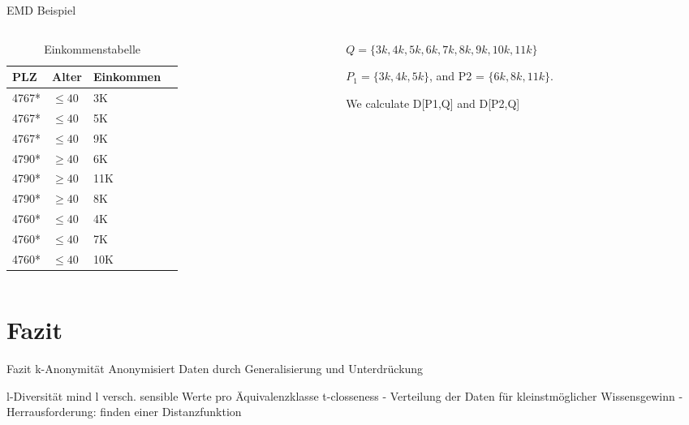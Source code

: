 \begin{frame} {EMD Beispiel}

\begin{columns}[T]
  \begin{column}{0.5\textwidth}
    \begin{table}[]
      \centering
      \label{tclossenessExample}
      \begin{tabular}{|l|l|l|l}
      \hline
      \textbf{PLZ}   & \textbf{Alter}    & \textbf{Einkommen} \\\hline
      4767* & $\le 40$ & 3K \\
      4767* & $\le 40$ & 5K \\
      4767* & $\le 40$ & 9K \\\hline
      4790* & $\ge 40$ & 6K \\
      4790* & $\ge 40$ & 11K \\
      4790* & $\ge 40$ & 8K \\\hline
      4760* & $\le 40$ & 4K \\
      4760* & $\le 40$ & 7K \\
      4760* & $\le 40$ & 10K \\\hline
      \end{tabular}
      \caption{Einkommenstabelle}
    \end{table}
    \end{column}

      \begin{column}{0.5\textwidth}
        $Q = \{3k, 4k, 5k, 6k, 7k, 8k, 9k, 10k, 11k\}$
        
        $P_1 = \{3k, 4k, 5k\}$, and P2 = \(\{6k, 8k, 11k\}\). 
        
        We calculate
        D[P1,Q] and D[P2,Q]
    \end{column}
\end{columns}
\end{frame}

\section{Fazit}
\begin{frame} {Fazit}
k-Anonymität
	Anonymisiert Daten durch Generalisierung und Unterdrückung
    
l-Diversität
	mind l versch. sensible Werte pro Äquivalenzklasse
t-closseness
	- Verteilung  der Daten für kleinstmöglicher Wissensgewinn	
    - Herrausforderung: finden einer    	  Distanzfunktion
\end{frame}
